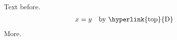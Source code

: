 \documentclass{article}
\begin{document}
Text before.
\begin{align}
x& = y && \text{by \hyperlink{top}{D}}
\end{align}
More.\hypertarget{top}{}
\end{document}
